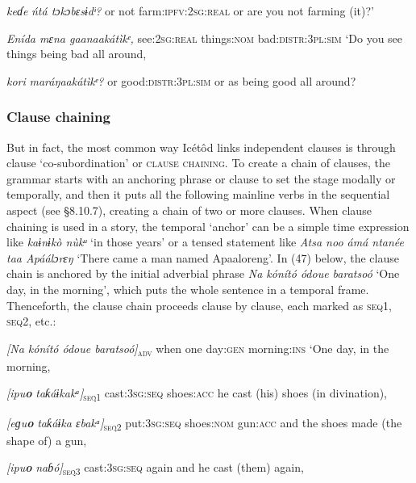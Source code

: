 \textit{keɗe}\textit{   ńtá   tɔkɔbɛsɨdᶤ?}
or   not   farm:\textsc{ipfv:2sg:real}
or are you not farming (it)?’




\textit{Enída       mɛna     gaanaakátìkᵉ,}
see:\textsc{2sg:real}   things:\textsc{nom}   bad:\textsc{distr:3pl:sim}
‘Do you see things being bad all around,



\textit{kori}\textit{   maráŋaakátìkᵉ?}
or   good:\textsc{distr:3pl:sim}
or as being good all around?




\subsubsection{Clause chaining}

But in fact, the most common way Icétôd links independent clauses is through clause ‘co-subordination’ or \textsc{clause chaining}. To create a chain of clauses, the grammar starts with an anchoring phrase or clause to set the stage modally or temporally, and then it puts all the following mainline verbs in the sequential aspect (see §8.10.7), creating a chain of two or more clauses. When clause chaining is used in a story, the temporal ‘anchor’ can be a simple time expression like \textit{kaɨnɨkò nùkᵘ} ‘in those years’ or a tensed statement like \textit{Atsa noo ámá ntanée taa Apáálɔrɛŋ} ‘There came a man named Apaaloreng’. In (47) below, the clause chain is anchored by the initial adverbial phrase \textit{Na kónít}\textit{ó ódoue baratsoó} ‘One day, in the morning’, which puts the whole sentence in a temporal frame. Thenceforth, the clause chain proceeds clause by clause, each marked as \textsc{seq1}, \textsc{seq2}, etc.:




\textit{[Na     kónító      ódoue   baratsoó]}\textsc{\textsubscript{adv}}
when    one    day:\textsc{gen}   morning:\textsc{ins}   
‘One day, in the morning, 

\textit{[ipu}\textbf{\textit{o}}\textit{            taƙáɨkakᵃ]}\textsc{\textsubscript{seq1}}
cast:\textsc{3sg:seq}   shoes:\textsc{acc}
he cast (his) shoes (in divination),

\textit{[eɡu}\textbf{\textit{o}}\textit{           taƙáɨka         ɛbakᵃ]}\textsc{\textsubscript{seq2}}
put:\textsc{3sg:seq}   shoes\textsc{:nom}     gun:\textsc{acc}
and the shoes made (the shape of) a gun,

\textit{[ipu}\textbf{\textit{o}} \textit{           naɓó]}\textsc{\textsubscript{seq3}}
cast:\textsc{3sg:seq}   again 
and he cast (them) again,

